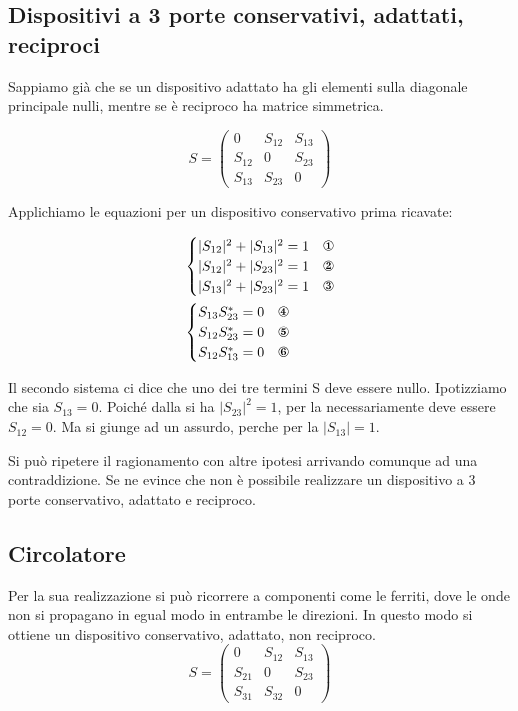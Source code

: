 \subsection{Dispositivi a 3 porte conservativi, adattati, reciproci}
Sappiamo già che se un dispositivo adattato ha gli elementi sulla diagonale principale nulli, mentre se è reciproco ha matrice simmetrica.

\[
S = \left(\begin{array}{ccc}
0&S_{12}&S_{13}\\
S_{12}&0&S_{23}\\
S_{13}&S_{23}&0
\end{array}\right)
\]

Applichiamo le equazioni per un dispositivo conservativo prima ricavate:

\begin{align*}
&\begin{cases}
|S_{12}|^2 + |S_{13}|^2 = 1 & \mbox{\ding{172}}\\
|S_{12}|^2 + |S_{23}|^2 = 1 & \mbox{\ding{173}}\\
|S_{13}|^2 + |S_{23}|^2 = 1 & \mbox{\ding{174}}\\
\end{cases}
\\
&\begin{cases}
S_{13}S_{23}^* = 0 & \mbox{\ding{175}}\\
S_{12}S_{23}^* = 0 & \mbox{\ding{176}}\\
S_{12}S_{13}^* = 0 & \mbox{\ding{177}}\\
\end{cases}
\end{align*}

Il secondo sistema ci dice che uno dei tre termini S deve essere nullo. Ipotizziamo che sia $S_{13} = 0$.
Poiché dalla  si ha $|S_{23}|^2 = 1$, per la  necessariamente deve essere $S_{12} = 0$. Ma si giunge ad un assurdo, perche per la  $|S_{13}| = 1$.

Si può ripetere il ragionamento con altre ipotesi arrivando comunque ad una contraddizione. Se ne evince che non è possibile realizzare un dispositivo a 3 porte conservativo, adattato e reciproco.

\subsection{Circolatore}
Per la sua realizzazione si può ricorrere a componenti come le ferriti, dove le onde non si propagano in egual modo in entrambe le direzioni. In questo modo si ottiene un dispositivo conservativo, adattato, non reciproco.
\[
S=
\left(\begin{array}{ccc}
0&S_{12}&S_{13}\\
S_{21}&0&S_{23}\\
S_{31}&S_{32}&0
\end{array}\right)
\]

